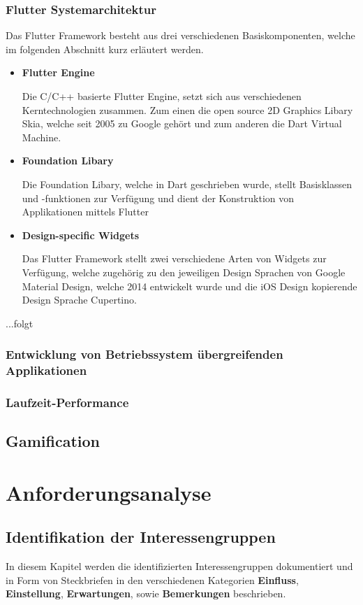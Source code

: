 \documentclass{scrreprt}
\begin{document}
\subsection{Flutter Systemarchitektur} 
Das Flutter Framework besteht aus drei verschiedenen Basiskomponenten, welche im folgenden Abschnitt kurz erläutert werden.
\begin{itemize}
\item{\textbf{Flutter Engine}}

Die C/C++ basierte Flutter Engine, setzt sich aus verschiedenen Kerntechnologien zusammen. Zum einen die open source 2D Graphics Libary Skia\cite{Skia1}, welche seit 2005 zu Google gehört und zum anderen die Dart Virtual Machine.
\item{\textbf{Foundation Libary}}

Die Foundation Libary, welche in Dart geschrieben wurde, stellt Basisklassen und -funktionen zur Verfügung und dient der Konstruktion von Applikationen mittels Flutter
\item{\textbf{Design-specific Widgets}}

Das Flutter Framework stellt zwei verschiedene Arten von Widgets zur Verfügung, welche zugehörig zu den jeweiligen Design Sprachen von Google Material Design\cite{Mat1}, welche 2014 entwickelt wurde und die iOS Design kopierende Design Sprache Cupertino\cite{Cup1}.
\end{itemize}

		...folgt

\subsection{Entwicklung von Betriebssystem übergreifenden Applikationen}

\subsection{Laufzeit-Performance}

\section{Gamification}


\chapter{Anforderungsanalyse}

\section{Identifikation der Interessengruppen}
\par In diesem Kapitel werden die identifizierten Interessengruppen dokumentiert und in Form von Steckbriefen in den verschiedenen Kategorien \textbf{Einfluss}, \textbf{Einstellung}, \textbf{Erwartungen}, sowie \textbf{Bemerkungen}  beschrieben.  
\end{document}
